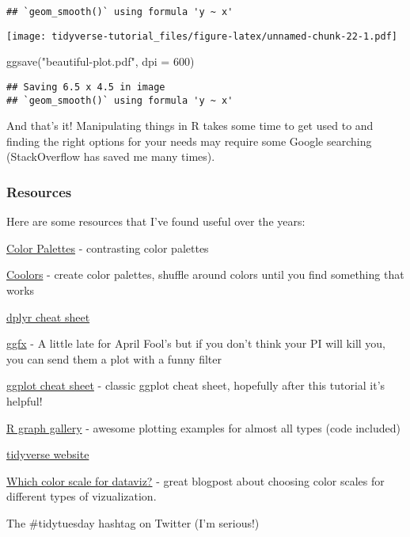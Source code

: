 \documentclass[
]{article}
\newenvironment{Shaded}{\begin{snugshade}}{\end{snugshade}}
\newcommand{\AttributeTok}[1]{\textcolor[rgb]{0.77,0.63,0.00}{#1}}
\newcommand{\DecValTok}[1]{\textcolor[rgb]{0.00,0.00,0.81}{#1}}
\newcommand{\FunctionTok}[1]{\textcolor[rgb]{0.00,0.00,0.00}{#1}}
\newcommand{\NormalTok}[1]{#1}
\newcommand{\StringTok}[1]{\textcolor[rgb]{0.31,0.60,0.02}{#1}}
\begin{document}
\begin{verbatim}
## `geom_smooth()` using formula 'y ~ x'
\end{verbatim}

\texttt{[image: tidyverse-tutorial\_files/figure-latex/unnamed-chunk-22-1.pdf]}

\begin{Shaded}
\begin{Highlighting}[]
\FunctionTok{ggsave}\NormalTok{(}\StringTok{"beautiful{-}plot.pdf"}\NormalTok{, }\AttributeTok{dpi =} \DecValTok{600}\NormalTok{)}
\end{Highlighting}
\end{Shaded}

\begin{verbatim}
## Saving 6.5 x 4.5 in image
## `geom_smooth()` using formula 'y ~ x'
\end{verbatim}

And that's it! Manipulating things in R takes some time to get used to
and finding the right options for your needs may require some Google
searching (StackOverflow has saved me many times).

\hypertarget{resources-1}{%
\subsubsection{Resources}\label{resources-1}}

Here are some resources that I've found useful over the years:

\href{https://colorpalettes.net/category/contrasting-color/}{Color
Palettes} - contrasting color palettes

\href{https://coolors.co/6a0f49-d741a7-7d83ff-007fff-2d898b-7cb518-12664f-ffa62b-59c3c3-ebebeb}{Coolors}
- create color palettes, shuffle around colors until you find something
that works

\href{https://www.rstudio.com/wp-content/uploads/2015/02/data-wrangling-cheatsheet.pdf}{dplyr
cheat sheet}

\href{https://www.data-imaginist.com/2021/say-goodbye-to-good-taste/}{ggfx}
- A little late for April Fool's but if you don't think your PI will
kill you, you can send them a plot with a funny filter

\href{https://www.rstudio.com/wp-content/uploads/2016/11/ggplot2-cheatsheet-2.1.pdf}{ggplot
cheat sheet} - classic ggplot cheat sheet, hopefully after this tutorial
it's helpful!

\href{https://www.r-graph-gallery.com}{R graph gallery} - awesome
plotting examples for almost all types (code included)

\href{https://www.tidyverse.org}{tidyverse website}

\href{https://blog.datawrapper.de/which-color-scale-to-use-in-data-vis/}{Which
color scale for dataviz?} - great blogpost about choosing color scales
for different types of vizualization.

The \#tidytuesday hashtag on Twitter (I'm serious!)\\
\end{document}
